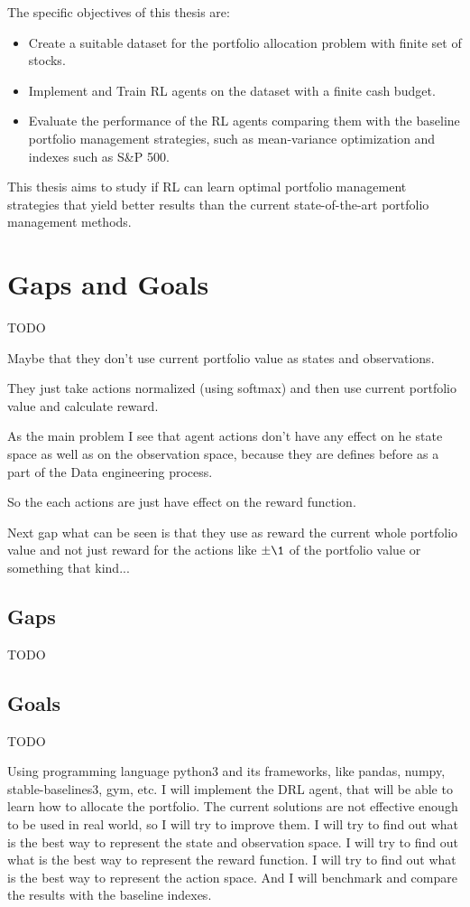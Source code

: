 The specific objectives of this thesis are:
\begin{itemize}
    \item Create a suitable dataset for the portfolio allocation problem with
    finite set of stocks.
    \item Implement and Train RL agents on the dataset with a finite cash budget.
    \item Evaluate the performance of the RL agents comparing them with the
    baseline portfolio management strategies, such as mean-variance optimization
    and indexes such as S\&P 500.
\end{itemize}

This thesis aims to study if RL can learn optimal portfolio management strategies
that yield better results than the current state-of-the-art portfolio management
methods.




\chapter{Gaps and Goals}\label{ch:gaps-and-goals}
TODO

Maybe that they don't use current portfolio value as states and observations.

They just take actions normalized (using softmax) and then use current portfolio value
and calculate reward.

As the main problem I see that agent actions don't have any effect on he
state space as well as on the observation space, because they are defines
before as a part of the Data engineering process.

So the each actions are just have effect on the reward function.

Next gap what can be seen is that they use as reward the current whole portfolio value
and not just reward for the actions like $\pm\1$ of the portfolio value or
something that kind...


\section{Gaps}\label{sec:gaps}
TODO


\section{Goals}\label{sec:goals}
TODO

Using programming language python3 and its frameworks, like pandas, numpy, stable-baselines3, gym, etc.
I will implement the DRL agent, that will be able to learn how to allocate the portfolio.
The current solutions are not effective enough to be used in real world, so I will try to improve them.
I will try to find out what is the best way to represent the state and observation space.
I will try to find out what is the best way to represent the reward function.
I will try to find out what is the best way to represent the action space.
And I will benchmark and compare the results with the baseline indexes.

